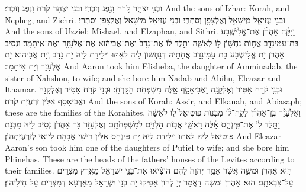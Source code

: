 {וּבְנֵ֖י יִצְהָ֑ר קֹ֥רַח וָנֶ֖פֶג וְזִכְרִֽי׃}
{וּבְנֵי יִצְהָר קֹרַח וָנֶפֶג וְזִכְרִי׃}
{And the sons of Izhar: Korah, and Nepheg, and Zichri.}{}
{וּבְנֵ֖י עֻזִּיאֵ֑ל מִֽישָׁאֵ֥ל וְאֶלְצָפָ֖ן וְסִתְרִֽי׃}
{וּבְנֵי עֻזִּיאֵל מִישָׁאֵל וְאֶלְצָפָן וְסִתְרִי׃}
{And the sons of Uzziel: Mishael, and Elzaphan, and Sithri.}{}
{וַיִּקַּ֨ח אַהֲרֹ֜ן אֶת־אֱלִישֶׁ֧בַע בַּת־עַמִּינָדָ֛ב אֲח֥וֹת נַחְשׁ֖וֹן ל֣וֹ לְאִשָּׁ֑ה וַתֵּ֣לֶד ל֗וֹ אֶת־נָדָב֙ וְאֶת־אֲבִיה֔וּא אֶת־אֶלְעָזָ֖ר וְאֶת־אִֽיתָמָֽר׃
}
{וּנְסֵיב אַהֲרֹן יָת אֱלִישֶׁבַע בַּת עַמִּינָדָב אֲחָתֵיהּ דְּנַחְשׁוֹן לֵיהּ לְאִתּוּ וִילֵידַת לֵיהּ יָת נָדָב וְיָת אֲבִיהוּא יָת אֶלְעָזָר וְיָת אִיתָמָר׃}
{And Aaron took him Elisheba, the daughter of Amminadab, the sister of Nahshon, to wife; and she bore him Nadab and Abihu, Eleazar and Ithamar.}{}
{וּבְנֵ֣י קֹ֔רַח אַסִּ֥יר וְאֶלְקָנָ֖ה וַאֲבִיאָסָ֑ף אֵ֖לֶּה מִשְׁפְּחֹ֥ת הַקׇּרְחִֽי׃}
{וּבְנֵי קֹרַח אַסִּיר וְאֶלְקָנָה וַאֲבִיאָסָף אִלֵּין זַרְעֲיָת קֹרַח׃}
{And the sons of Korah: Assir, and Elkanah, and Abiasaph; these are the families of the Korahites.}{}
{וְאֶלְעָזָ֨ר בֶּֽן־אַהֲרֹ֜ן לָקַֽח־ל֨וֹ מִבְּנ֤וֹת פּֽוּטִיאֵל֙ ל֣וֹ לְאִשָּׁ֔ה וַתֵּ֥לֶד ל֖וֹ אֶת־פִּֽינְחָ֑ס אֵ֗לֶּה רָאשֵׁ֛י אֲב֥וֹת הַלְוִיִּ֖ם לְמִשְׁפְּחֹתָֽם׃
}
{וְאֶלְעָזָר בַּר אַהֲרֹן נְסֵיב לֵיהּ מִבְּנָת פּוּטִיאֵל לֵיהּ לְאִתּוּ וִילֵידַת לֵיהּ יָת פִּינְחָס אִלֵּין רֵישֵׁי אֲבָהָת לֵיוָאֵי לְזַרְעֲיָתְהוֹן׃}
{And Eleazar Aaron’s son took him one of the daughters of Putiel to wife; and she bore him Phinehas. These are the heads of the fathers’ houses of the Levites according to their families.}{}
{ה֥וּא אַהֲרֹ֖ן וּמֹשֶׁ֑ה אֲשֶׁ֨ר אָמַ֤ר יְהֹוָה֙ לָהֶ֔ם הוֹצִ֜יאוּ אֶת־בְּנֵ֧י יִשְׂרָאֵ֛ל מֵאֶ֥רֶץ מִצְרַ֖יִם עַל־צִבְאֹתָֽם׃
}
{הוּא אַהֲרֹן וּמֹשֶׁה דַּאֲמַר יְיָ לְהוֹן אַפִּיקוּ יָת בְּנֵי יִשְׂרָאֵל מֵאַרְעָא דְּמִצְרַיִם עַל חֵילֵיהוֹן׃}
